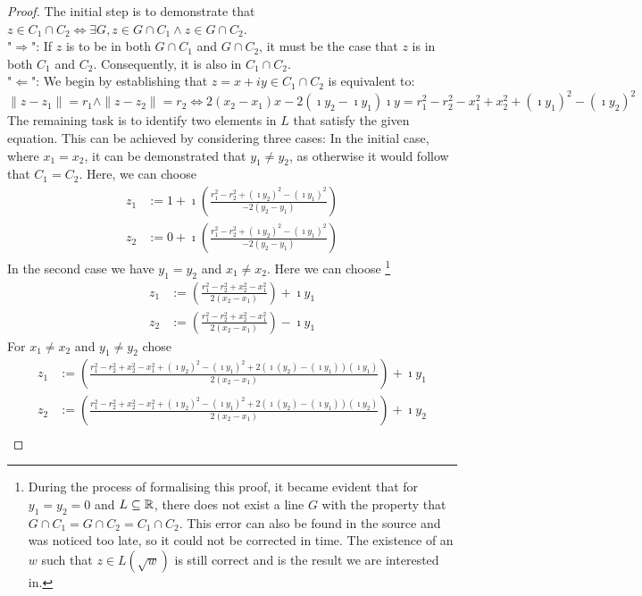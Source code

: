 \begin{proof}
    The initial step is to demonstrate that $ z\in C_1 \cap C_2 \Leftrightarrow \exists G,  z\in G \cap C_1 \land z \in G \cap C_2$.\\
    "$\Rightarrow$": If $z$ is to be in both $G \cap C_1$ and $G \cap C_2$, it must be the case that $z$ is in both $C_1$ and $C_2$. Consequently, it is also in $C_1 \cap C_2$. \\
    "$\Leftarrow$": We begin by establishing that $z=x + iy\in C_1\cap C_2$ is equivalent to:
        $$\|z-z_1\| = r_1 \land \|z - z_2\| = r_2 \Leftrightarrow 2(x_2-x_1)x-2(\imath y_2-\imath y_1)\imath y = r_1^2-r_2^2-x_1^2+x_2^2+(\imath y_1)^2-(\imath y_2)^2$$
        The remaining task is to identify two elements in $L$ that satisfy the given equation. This can be achieved by considering three cases:
        In the initial case, where $x_1 = x_2$, it can be demonstrated that $y_1 \ne y_2$, as otherwise it would follow that $C_1=C_2$. Here, we can choose
        \begin{align*}
            z_1 &:= 1 + \imath (\frac{r_1^2 - r_2^2 + (\imath y_2)^2 - (\imath y_1)^2}{-2(y_2-y_1)})\\
            z_2 &:= 0 + \imath (\frac{r_1^2 - r_2^2 + (\imath y_2)^2 - (\imath y_1)^2}{-2(y_2-y_1)})
        \end{align*}
        In the second case we have $y_1 = y_2$ and $x_1 \ne x_2$. Here we can choose 
        \footnote[1]{During the process of formalising this proof, it became evident that for $y_1=y_2=0$ and $L\subseteq\mathbb{R}$, there does not exist a line $G$ with the property that $G\cap C_1=G\cap C_2=C_1\cap C_2$.
            This error can also be found in the source \cite{JAN_SCHRÖER:2023} and was noticed too late, so it could not be corrected in time. The existence of an $w$ such that $z\in L(\sqrt{w})$ is still correct and is the result we are interested in.}
        \begin{align*}
            z_1 &:= (\frac{r_1^2 - r_2^2 + x_2^2 - x_1^2}{2(x_2-x_1)}) + \imath y_1\\
            z_2 &:= (\frac{r_1^2 - r_2^2 + x_2^2 - x_1^2}{2(x_2-x_1)}) - \imath y_1
        \end{align*}
        For $ x_1 \ne x_2$ and $y_1 \ne y_2$ chose 
        \begin{align*}
            z_1 &:= (\frac{r_1^2 - r_2^2 + x_2^2 - x_1^2 + (\imath y_2)^2 - (\imath y_1)^2+2(\imath (y_2)-(\imath y_1))(\imath y_1)}{2(x_2-x_1)}) + \imath y_1\\ %
            z_2 &:= (\frac{r_1^2 - r_2^2 + x_2^2 - x_1^2 + (\imath y_2)^2 - (\imath y_1)^2+2(\imath (y_2)-(\imath y_1))(\imath y_2)}{2(x_2-x_1)}) + \imath y_2\\
        \end{align*}
    

\end{proof}
